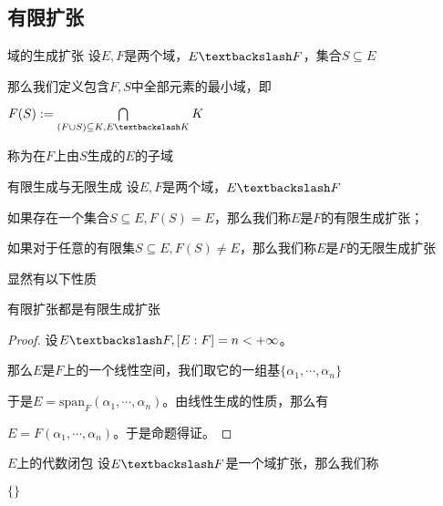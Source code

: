 \documentclass[12pt, a4paper, oneside, UTF8]{ctexbook}
\begin{document}
		\subsection{有限扩张}
			\begin{defn}{域的生成扩张}{}
				设$E,F$是两个域，$E\textbackslash F$，集合$S \subseteq E$

				那么我们定义包含$F,S$中全部元素的最小域，即

				$F(S) := \bigcap\limits_{(F \cup S) \subseteq K,E \textbackslash K} K$

				称为在$F$上由$S$生成的$E$的子域
			\end{defn}
			\begin{defn}{有限生成与无限生成}{}
				设$E,F$是两个域，$E\textbackslash F$

				如果存在一个集合$S \subseteq E,F(S) = E$，那么我们称$E$是$F$的有限生成扩张；

				如果对于任意的有限集$S \subseteq E,F(S) \neq E$，那么我们称$E$是$F$的无限生成扩张
			\end{defn}
			显然有以下性质
			\begin{proposition}
				有限扩张都是有限生成扩张
			\end{proposition}
			\begin{proof}
				设$E \textbackslash F,[E:F]=n < +\infty$。

				那么$E$是$F$上的一个线性空间，我们取它的一组基$\{\alpha_1,\cdots,\alpha_n\}$

				于是$E = \text{span}_F (\alpha_1,\cdots,\alpha_n)$。由线性生成的性质，那么有

				$E = F(\alpha_1,\cdots,\alpha_n)$。于是命题得证。
			\end{proof}
			\begin{defn}{$E$上的代数闭包}{}
				设$E \textbackslash F$是一个域扩张，那么我们称
				
				$\{\}$
			\end{defn}
\ifx\allfiles\undefined
\end{document}
